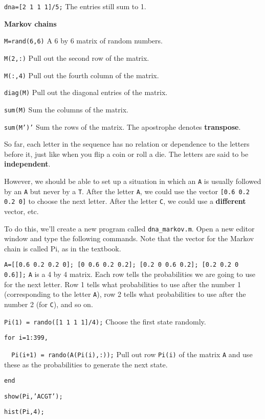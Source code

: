 \item {\tt dna=[2 1 1 1]/5;} \hfill The entries still sum to 1.

\hspace*{-0.5in}
{\bf Markov chains}

\item {\tt M=rand(6,6)} \hfill A 6 by 6 matrix of random numbers.
\item {\tt M(2,:)} \hfill Pull out the second row of the matrix.
\item {\tt M(:,4)} \hfill Pull out the fourth column of the matrix.
\item {\tt diag(M)} \hfill Pull out the diagonal entries of the matrix.
\item {\tt sum(M)} \hfill Sum the columns of the matrix.
\item {\tt sum(M')'} \hfill Sum the rows of the matrix.  The apostrophe
denotes {\bf transpose}.

So far, each letter in the sequence has no relation or dependence to the
letters before it, just like when you flip a coin or roll a die.
The letters are said to be {\bf independent}.

However, we should be able to set up a situation in which an {\tt A} is
usually followed by an {\tt A} but never by a {\tt T}.
After the letter {\tt A}, we could use the vector {\tt [0.6 0.2 0.2 0]} to
choose the next letter.
After the letter {\tt C}, we could use a {\bf different} vector, etc.

To do this, we'll create a new program called {\tt dna\_markov.m}.
Open a new editor window and type the following commands.
Note that the vector for the Markov chain is called Pi, as in the textbook.

\item {\tt A=[[0.6 0.2 0.2 0]; [0 0.6 0.2 0.2]; [0.2 0 0.6 0.2]; [0.2 0.2 0
0.6]];} \hfill {\tt A} is a 4 by 4 matrix.
Each row tells the probabilities we are going to use for the next letter.
Row 1 tells what probabilities to use after the number 1 (corresponding to
the letter {\tt A}), row 2 tells what probabilities to use after the number
2 (for {\tt C}), and so on.
\item {\tt Pi(1) = rando([1 1 1 1]/4);} \hfill Choose the first state randomly.
\item {\tt for i=1:399,} \hfill
\item {\tt ~~Pi(i+1) = rando(A(Pi(i),:));} \hfill Pull out row {\tt Pi(i)} of
the matrix {\tt A} and use these as the probabilities to generate the next
state. 
\item {\tt end} \hfill
\item {\tt show(Pi,'ACGT');} \hfill
\item {\tt hist(Pi,4);} \hfill

